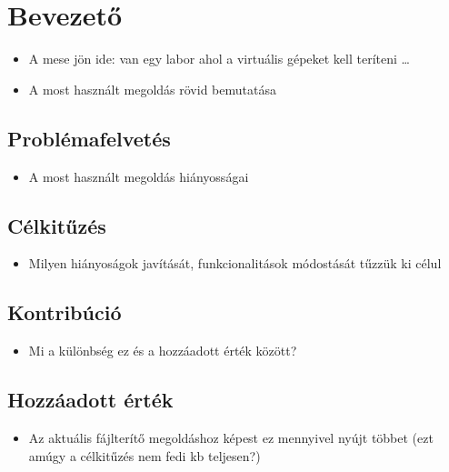 \chapter{Bevezető} 
\begin{itemize}
  \item A mese jön ide: van egy labor ahol a virtuális gépeket kell teríteni \ldots
  \item A most használt megoldás rövid bemutatása
\end{itemize}

\section{Problémafelvetés}
\begin{itemize}
  \item A most használt megoldás hiányosságai 
\end{itemize}

\section{Célkitűzés}
\begin{itemize}
  \item Milyen hiányoságok javítását, funkcionalitások módostását tűzzük ki célul
\end{itemize}
\section{Kontribúció}
\begin{itemize}
  \item Mi a különbség ez és a hozzáadott érték között?
\end{itemize}
\section{Hozzáadott érték}
\begin{itemize}
  \item Az aktuális fájlterítő megoldáshoz képest ez mennyivel nyújt többet (ezt amúgy a célkitűzés nem fedi kb teljesen?)
\end{itemize}
